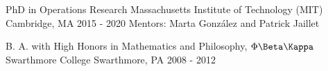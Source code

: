 

\begin{cventries}

  \cventry
    {PhD in Operations Research} %
    {Massachusetts Institute of Technology (MIT)} %
    {Cambridge, MA} %
    {2015 - 2020} %
    {Mentors: Marta Gonz\'{a}lez and Patrick Jaillet}

  \cventry
    {B. A. with High Honors in Mathematics and Philosophy, $\Phi\Beta\Kappa$} %
    {Swarthmore College} %
    {Swarthmore, PA} %
    {2008 - 2012} %
    {}  

\end{cventries}
